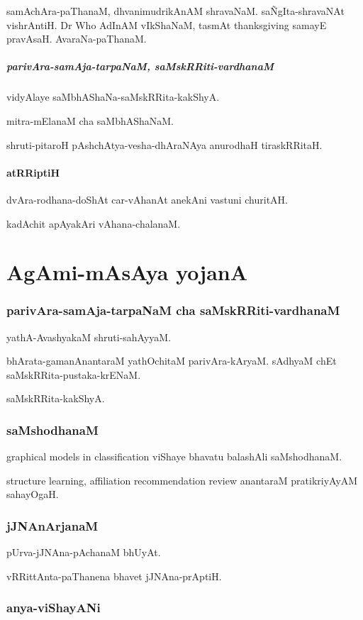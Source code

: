 \documentclass[oneside, article]{memoir}
\begin{document}
samAchAra-paThanaM, dhvanimudrikAnAM shravaNaM. sa\~NgIta-shravaNAt vishrAntiH. Dr Who AdInAM vIkShaNaM, tasmAt thanksgiving samayE pravAsaH. AvaraNa-paThanaM.

\subsubsection{parivAra-samAja-tarpaNaM, saMskRRiti-vardhanaM}
vidyAlaye saMbhAShaNa-saMskRRita-kakShyA.

mitra-mElanaM cha saMbhAShaNaM.

shruti-pitaroH pAshchAtya-vesha-dhAraNAya anurodhaH tiraskRRitaH.

\subsection{atRRiptiH}
dvAra-rodhana-doShAt car-vAhanAt anekAni vastuni churitAH.

kadAchit apAyakAri vAhana-chalanaM.

\part{AgAmi-mAsAya yojanA}
\section{parivAra-samAja-tarpaNaM cha saMskRRiti-vardhanaM}
yathA-AvashyakaM shruti-sahAyyaM.

bhArata-gamanAnantaraM yathOchitaM parivAra-kAryaM. sAdhyaM chEt saMskRRita-pustaka-krENaM.

saMskRRita-kakShyA.

\section{saMshodhanaM}
graphical models in classification viShaye bhavatu balashAli saMshodhanaM.

structure learning, affiliation recommendation review anantaraM pratikriyAyAM sahayOgaH.

\section{jJNAnArjanaM}
pUrva-jJNAna-pAchanaM bhUyAt.

vRRittAnta-paThanena bhavet jJNAna-prAptiH.

\section{anya-viShayANi}
\end{document}
